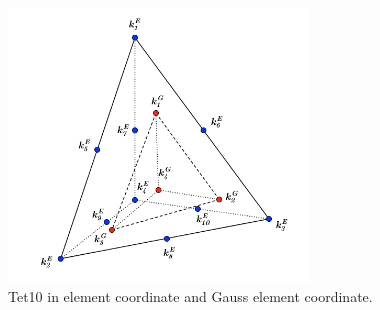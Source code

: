 \begin{figure}[h]
	\begin{center}
		\includegraphics[width=8cm,clip]{Tet10.pdf}			
		\caption{Tet10 in element coordinate and Gauss element coordinate.} \label{fig: Tet10}
	\end{center} 
\end{figure}

